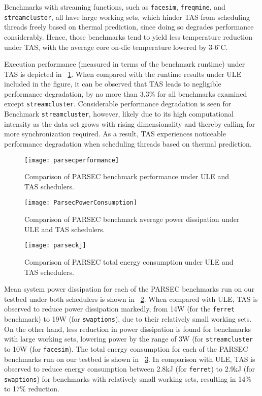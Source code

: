 Benchmarks with streaming functions, such as \texttt{facesim},
\texttt{freqmine}, and \texttt{streamcluster}, all have large working
sets, which hinder TAS from scheduling threads freely based on thermal
prediction, since doing so degrades performance considerably.  Hence,
those benchmarks tend to yield less temperature reduction under TAS,
with the average core on-die temperature lowered by 3-6$^{\circ}$C.  

Execution performance (measured in terms of the benchmark runtime) under TAS 
is depicted in \figurename~\ref{fig:pbenchmarkp}.
When compared with the runtime results under ULE included in the figure,
it can be observed that TAS leads to negligible performance degradation,
by no more than 3.3\% for all benchmarks examined except \texttt{streamcluster}.
Considerable performance degradation is seen for Benchmark \texttt{streamcluster},
however, likely due to its high computational intensity as the data set
grows with rising dimensionality and thereby calling for
more synchronization required.
As a result, TAS experiences noticeable performance degradation
when scheduling threads based on thermal prediction.

\begin{figure}[tbp]
  \texttt{[image: parsecperformance]}
  \caption{Comparison of PARSEC benchmark performance under ULE and TAS
schedulers.}
  \label{fig:pbenchmarkp}
\end{figure} 
\begin{figure}[tbp]
  \texttt{[image: ParsecPowerConsumption]}
  \caption{Comparison of PARSEC benchmark average power dissipation under ULE and TAS schedulers.}
  \label{fig:pbenchmark}
\end{figure}
\begin{figure}[tbp]
  \centering
  \texttt{[image: parseckj]}
  \caption{Comparison of PARSEC total energy consumption under ULE and TAS schedulers.}
  \label{fig:penergy}
\end{figure}
Mean system power dissipation for each of the PARSEC benchmarks run on
our testbed under both schedulers is shown in
\figurename~\ref{fig:pbenchmark}.  When compared with ULE, TAS is
observed to reduce power dissipation markedly, from 14W (for the
\texttt{ferret} benchmark) to 19W (for \texttt{swaptions}), due to their
relatively small working sets.  On the other hand, less reduction in
power dissipation is found for benchmarks with large working sets,
lowering power by the range of 3W (for \texttt{streamcluster} to 10W
(for \texttt{facesim}).  The total energy consumption for each of the
PARSEC benchmarks run on our testbed is shown in
\figurename~\ref{fig:penergy}.  In comparison with ULE, TAS is observed
to reduce energy consumption between 2.8kJ (for \texttt{ferret}) to
2.9kJ (for \texttt{swaptions}) for benchmarks with relatively small
working sets, resulting in 14\% to 17\% reduction.

